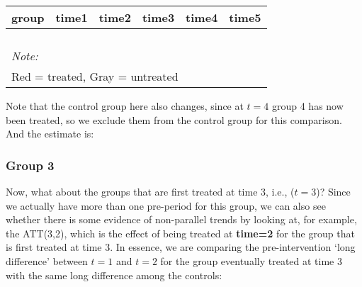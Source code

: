 \documentclass[
]{article}
\begin{document}
\begin{table}
\centering
\begin{tabular}[t]{>{}r|>{}r|>{}r|>{}r|>{}r|>{}r}
\hline
group & time1 & time2 & time3 & time4 & time5\\
\hline
\cellcolor{white}{2} & \cellcolor{red}{\textcolor{black}{0.631}} & \cellcolor{white}{0.711} & \cellcolor{white}{0.814} & \cellcolor{red}{\textcolor{black}{0.846}} & \cellcolor{white}{0.826}\\
\hline
\cellcolor{white}{3} & \cellcolor{white}{\textcolor{black}{0.678}} & \cellcolor{white}{0.770} & \cellcolor{white}{0.664} & \cellcolor{white}{\textcolor{black}{0.800}} & \cellcolor{white}{0.784}\\
\hline
\cellcolor{white}{4} & \cellcolor{white}{\textcolor{black}{0.778}} & \cellcolor{white}{0.807} & \cellcolor{white}{0.673} & \cellcolor{white}{\textcolor{black}{0.750}} & \cellcolor{white}{0.868}\\
\hline
\cellcolor{white}{5} & \cellcolor{lightgray}{\textcolor{black}{0.854}} & \cellcolor{white}{0.939} & \cellcolor{white}{0.854} & \cellcolor{lightgray}{\textcolor{black}{0.800}} & \cellcolor{white}{0.855}\\
\hline
\multicolumn{6}{l}{\rule{0pt}{1em}\textit{Note: }}\\
\multicolumn{6}{l}{\rule{0pt}{1em}Red = treated, Gray = untreated}\\
\end{tabular}
\end{table}

Note that the control group here also changes, since at \(t=4\) group 4
has now been treated, so we exclude them from the control group for this
comparison. And the estimate is:

\hypertarget{group-3}{%
\subsubsection{Group 3}\label{group-3}}

Now, what about the groups that are first treated at time 3, i.e.,
(\(t=3\))? Since we actually have more than one pre-period for this
group, we can also see whether there is some evidence of non-parallel
trends by looking at, for example, the ATT(3,2), which is the effect of
being treated at \textbf{time=2} for the group that is first treated at
time 3. In essence, we are comparing the pre-intervention `long
difference' between \(t=1\) and \(t=2\) for the group eventually treated
at time 3 with the same long difference among the controls:
\end{document}
